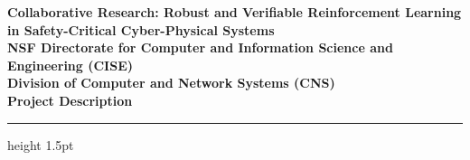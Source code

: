 \documentclass[11pt,letterpaper]{article}
\begin{document}
\color{neutral-dark}

\begin{center}
    {\color{accent}\LARGE\bfseries Collaborative Research: Robust and Verifiable Reinforcement Learning in Safety-Critical Cyber-Physical Systems} \\[1.2em]
    {\large\bfseries NSF Directorate for Computer and Information Science and Engineering (CISE)} \\[0.3em]
    {\large\bfseries Division of Computer and Network Systems (CNS)} \\[1.5em]
    \textbf{Project Description}
\end{center}
\vspace{0.5em}
{\color{accent}\hrule height 1.5pt}
\vspace{1.5em}







\end{document}
